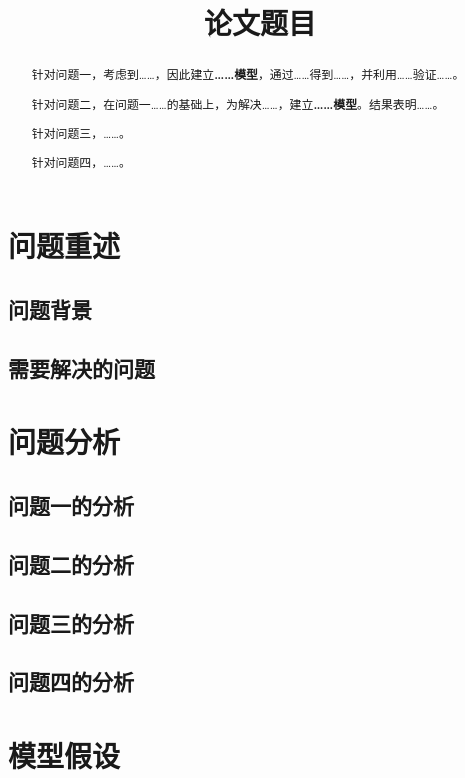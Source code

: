 \documentclass[withoutpreface]{cumcmthesis}
\title{论文题目}
\begin{document}
\maketitle

\begin{abstract}

针对问题一，考虑到……，因此建立\textbf{……模型}，通过……得到……，并利用……验证……。

针对问题二，在问题一……的基础上，为解决……，建立\textbf{……模型}。结果表明……。

针对问题三，……。

针对问题四，……。

\end{abstract}
\newpage

\section{问题重述}
\subsection{问题背景}
\subsection{需要解决的问题}

\section{问题分析}
\subsection{问题一的分析}
\subsection{问题二的分析}
\subsection{问题三的分析}
\subsection{问题四的分析}


\section{模型假设}
\end{document}
